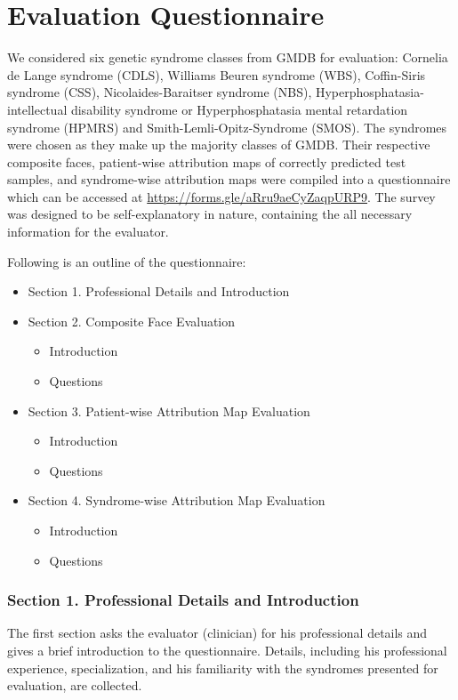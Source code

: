 \documentclass[../report.tex]{subfiles}
\begin{document}
   \section{Evaluation Questionnaire}
       \noindent
   We considered six genetic syndrome classes from GMDB for evaluation: Cornelia de Lange syndrome (CDLS), Williams Beuren syndrome (WBS),  Coffin-Siris syndrome (CSS),  Nicolaides-Baraitser syndrome (NBS), Hyperphosphatasia-intellectual disability syndrome or Hyperphosphatasia mental retardation syndrome (HPMRS) and Smith-Lemli-Opitz-Syndrome (SMOS). The syndromes were chosen as they make up the majority classes of GMDB. Their respective composite faces, patient-wise attribution maps of correctly predicted test samples, and syndrome-wise attribution maps were compiled into a questionnaire which can be accessed at \url{https://forms.gle/aRru9aeCyZaqpURP9}. The survey was designed to be self-explanatory in nature, containing the all necessary information for the evaluator.
   
   Following is an outline of the questionnaire:
   \begin{itemize}
   	\item Section 1. Professional Details and Introduction
   	\item Section 2. Composite Face Evaluation
   		\begin{itemize}
   		\item Introduction
   		\item Questions
   		\end{itemize}
   \item Section 3. Patient-wise Attribution Map Evaluation
   		\begin{itemize}
   		\item Introduction
   		\item Questions	
   		\end{itemize}
   	\item Section 4. Syndrome-wise Attribution Map Evaluation
   	\begin{itemize}
   	\item Introduction
   	\item Questions
   \end{itemize}
   \end{itemize}

   \subsubsection{Section 1. Professional Details and Introduction}
   The first section asks the evaluator (clinician) for his professional details and gives a brief introduction to the questionnaire. Details, including his professional experience, specialization, and his familiarity with the syndromes presented for evaluation, are collected. 
    
\end{document}
